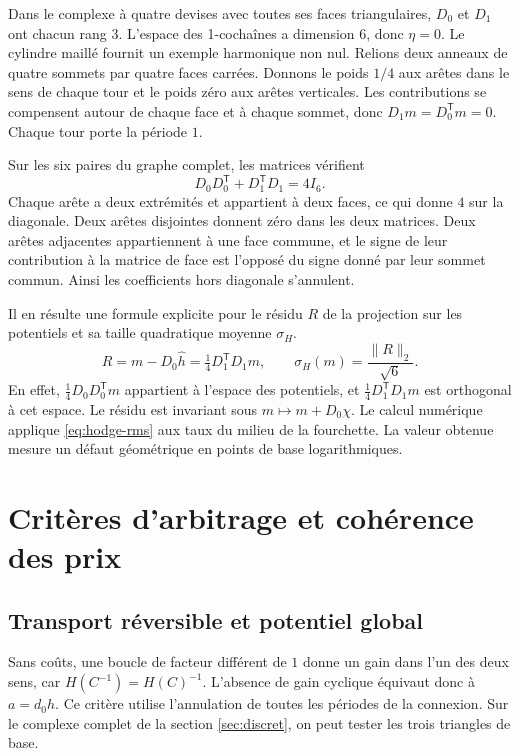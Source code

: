 \documentclass[11pt,a4paper]{article}
\theoremstyle{clair}
\begin{document}
Dans le complexe à quatre devises avec toutes ses faces triangulaires, \(D_0\) et \(D_1\) ont chacun rang \(3\). L'espace des 1-cochaînes a dimension \(6\), donc \(\eta=0\). Le cylindre maillé fournit un exemple harmonique non nul. Relions deux anneaux de quatre sommets par quatre faces carrées. Donnons le poids \(1/4\) aux arêtes dans le sens de chaque tour et le poids zéro aux arêtes verticales. Les contributions se compensent autour de chaque face et à chaque sommet, donc \(D_1m=D_0^{\mathsf T}m=0\). Chaque tour porte la période \(1\).

Sur les six paires du graphe complet, les matrices vérifient
\begin{equation}
 D_0D_0^{\mathsf T}+D_1^{\mathsf T}D_1=4I_6.
 \label{eq:laplacien}
\end{equation}
Chaque arête a deux extrémités et appartient à deux faces, ce qui donne \(4\) sur la diagonale. Deux arêtes disjointes donnent zéro dans les deux matrices. Deux arêtes adjacentes appartiennent à une face commune, et le signe de leur contribution à la matrice de face est l'opposé du signe donné par leur sommet commun. Ainsi les coefficients hors diagonale s'annulent.

Il en résulte une formule explicite pour le résidu \(R\) de la projection sur les potentiels et sa taille quadratique moyenne \(\sigma_H\).
\begin{equation}
 R=m-D_0\widehat h=\tfrac14D_1^{\mathsf T}D_1m,\qquad
 \sigma_H(m)=\frac{\|R\|_2}{\sqrt{6}} .
 \label{eq:hodge-rms}
\end{equation}
En effet, \(\tfrac14D_0D_0^{\mathsf T}m\) appartient à l'espace des potentiels, et \(\tfrac14D_1^{\mathsf T}D_1m\) est orthogonal à cet espace. Le résidu est invariant sous \(m\mapsto m+D_0\chi\). Le calcul numérique applique \eqref{eq:hodge-rms} aux taux du milieu de la fourchette. La valeur obtenue mesure un défaut géométrique en points de base logarithmiques.

\clearpage
\section{Critères d'arbitrage et cohérence des prix}
\label{sec:criteres}
\subsection{Transport réversible et potentiel global}

Sans coûts, une boucle de facteur différent de \(1\) donne un gain dans l'un des deux sens, car \(H(C^{-1})=H(C)^{-1}\). L'absence de gain cyclique équivaut donc à \(a=d_0h\). Ce critère utilise l'annulation de toutes les périodes de la connexion. Sur le complexe complet de la section \ref{sec:discret}, on peut tester les trois triangles de base.
\end{document}
